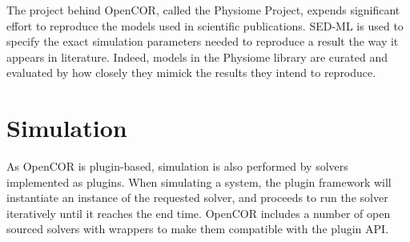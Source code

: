 \documentclass[\rootfolder/main.tex]{subfiles}
\begin{document}
The project behind OpenCOR, called the Physiome Project, expends significant effort to reproduce the models used in scientific publications.
SED-ML is used to specify the exact simulation parameters needed to reproduce a result the way it appears in literature.
Indeed, models in the Physiome library are curated and evaluated by how closely they mimick the results they intend to reproduce.

\section{Simulation}

As OpenCOR is plugin-based, simulation is also performed by solvers implemented as plugins.
When simulating a system, the plugin framework will instantiate an instance of the requested solver, and proceeds to run the solver iteratively until it reaches the end time.
OpenCOR includes a number of open sourced solvers with wrappers to make them compatible with the plugin API.
\end{document}
